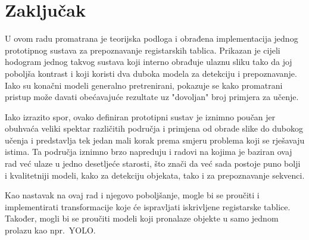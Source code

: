 \documentclass[times, utf8, diplomski]{fer}
\begin{document}
\chapter{Zaključak}
U ovom radu promatrana je teorijska podloga i obrađena implementacija jednog prototipnog sustava za prepoznavanje registarskih tablica. Prikazan je cijeli hodogram jednog takvog sustava koji interno obrađuje ulaznu sliku tako da joj poboljša kontrast i koji koristi dva duboka modela za detekciju i prepoznavanje. Iako su konačni modeli generalno pretrenirani, pokazuje se kako promatrani pristup može davati obećavajuće rezultate uz "dovoljan" broj primjera za učenje.

Iako izrazito spor, ovako definiran prototipni sustav je iznimno poučan jer obuhvaća veliki spektar različitih područja i primjena od obrade slike do dubokog učenja i predstavlja tek jedan mali korak prema smjeru problema koji se rješavaju istima. Ta područja iznimno brzo napreduju i radovi na kojima je baziran ovaj rad već ulaze u jedno desetljeće starosti, što znači da već sada postoje puno bolji i kvalitetniji modeli, kako za detekciju objekata, tako i za prepoznavanje sekvenci.

\bigskip

Kao nastavak na ovaj rad i njegovo poboljšanje, mogle bi se proučiti i implementirati transformacije koje će ispravljati iskrivljene registarske tablice. Također, mogli bi se proučiti modeli koji pronalaze objekte u samo jednom prolazu kao npr.\ YOLO.




\end{document}
